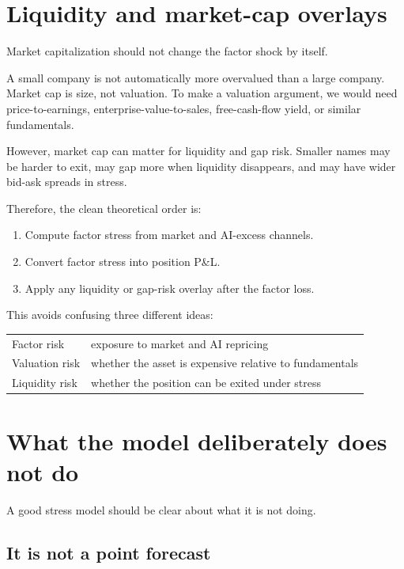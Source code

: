 \documentclass[10pt]{article}
\begin{document}
\section{Liquidity and market-cap overlays}

Market capitalization should not change the factor shock by itself.

A small company is not automatically more overvalued than a large company. Market cap is size, not valuation. To make a valuation argument, we would need price-to-earnings, enterprise-value-to-sales, free-cash-flow yield, or similar fundamentals.

However, market cap can matter for liquidity and gap risk. Smaller names may be harder to exit, may gap more when liquidity disappears, and may have wider bid-ask spreads in stress.

Therefore, the clean theoretical order is:

\begin{enumerate}
\item Compute factor stress from market and AI-excess channels.
\item Convert factor stress into position P\&L.
\item Apply any liquidity or gap-risk overlay after the factor loss.
\end{enumerate}

This avoids confusing three different ideas:

\begin{center}
\begin{tabular}{ll}
Factor risk & exposure to market and AI repricing \\
Valuation risk & whether the asset is expensive relative to fundamentals \\
Liquidity risk & whether the position can be exited under stress
\end{tabular}
\end{center}

\section{What the model deliberately does not do}

A good stress model should be clear about what it is not doing.

\subsection{It is not a point forecast}
\end{document}
